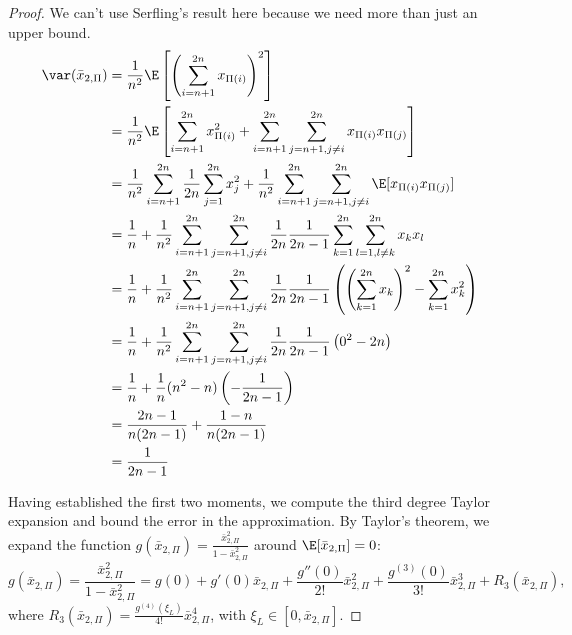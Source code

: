 \begin{proof}
  We can't use Serfling's result here because we need more than just an upper bound.
  \begin{align*}
    \var(\bar{x}_{2,\Pi})
    &= \frac{1}{n^2} \E \left [\left (\sum_{i=n+1}^{2n}x_{\Pi(i)}\right )^2\right ] \\
    &= \frac{1}{n^2} \E \left [\sum_{i=n+1}^{2n} x_{\Pi(i)}^2 +
    \sum_{i=n+1}^{2n}\sum_{j=n+1, j\neq i}^{2n}x_{\Pi(i)}x_{\Pi(j)} \right ] \\
    &= \frac{1}{n^2} \sum_{i=n+1}^{2n} \frac{1}{2n} \sum_{j=1}^{2n} x_{j}^2
    + \frac{1}{n^2}\sum_{i=n+1}^{2n}\sum_{j=n+1, j\neq
      i}^{2n} \E[x_{\Pi(i)} x_{\Pi(j)}] \\
    &= \frac{1}{n} + \frac{1}{n^2}\sum_{i=n+1}^{2n}\sum_{j=n+1, j\neq
      i}^{2n} \frac{1}{2n}\frac{1}{2n-1}\sum_{k=1}^{2n}
    \sum_{l=1, l\neq k}^{2n} x_kx_l \\
    &= \frac{1}{n} + \frac{1}{n^2}\sum_{i=n+1}^{2n}\sum_{j=n+1, j\neq
      i}^{2n} \frac{1}{2n}\frac{1}{2n-1} \left (
    \left (\sum_{k=1}^{2n} x_k \right )^2 - \sum_{k=1}^{2n} x_k^2
  \right ) \\
    &= \frac{1}{n} + \frac{1}{n^2}\sum_{i=n+1}^{2n}\sum_{j=n+1, j\neq
      i}^{2n} \frac{1}{2n}\frac{1}{2n-1} \left (
    0^2 - 2n \right ) \\
    &= \frac{1}{n} + \frac{1}{n}(n^2-n)\left (-\frac{1}{2n-1}\right ) \\
    &= \frac{2n-1}{n(2n-1)} + \frac{1-n}{n(2n-1)} \\
    &= \frac{1}{2n-1}
  \end{align*}

  Having established the first two moments, we compute the third degree Taylor expansion and bound
  the error in the approximation. By Taylor's theorem, we expand the function $g(\bar{x}_{2,\Pi}) =
  \frac{\bar{x}_{2,\Pi}^2}{1-\bar{x}_{2,\Pi}^2}$ around $\E[\bar{x}_{2,\Pi}] = 0$:
  \begin{equation*}
    g(\bar{x}_{2,\Pi}) = \frac{\bar{x}_{2,\Pi}^2}{1-\bar{x}_{2,\Pi}^2} = g(0) + g'(0)
    \bar{x}_{2,\Pi} + \frac{g''(0)}{2!}\bar{x}_{2,\Pi}^2 +
    \frac{g^{(3)}(0)}{3!}\bar{x}_{2,\Pi}^3 + R_3(\bar{x}_{2,\Pi}),
  \end{equation*}
  where $R_3(\bar{x}_{2,\Pi}) = \frac{g^{(4)}(\xi_L)}{4!}\bar{x}_{2,\Pi}^4$, with
  $\xi_L \in [0, \bar{x}_{2,\Pi}]$.


\end{proof}

